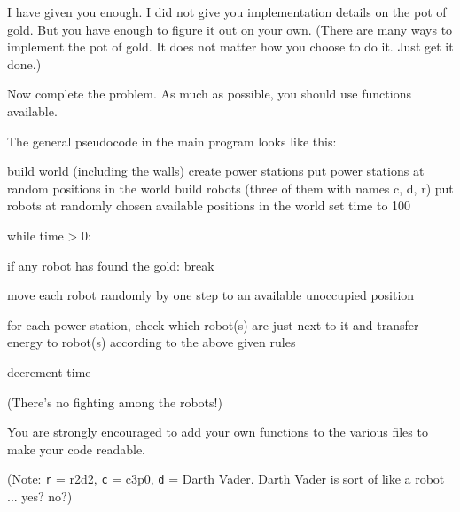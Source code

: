 I have given you enough. 
I did not give you implementation details on the pot of gold.
But you have enough to figure it out on your own.
(There are many ways to implement the pot of gold. It
does not matter how you choose to do it. Just get it done.)

Now complete the problem.
As much as possible, you should use functions available.

The general pseudocode in the main program looks like this:
\begin{console}
build world (including the walls)
create power stations
put power stations at random positions in the world
build robots (three of them with names c, d, r)
put robots at randomly chosen available positions in the world
set time to 100

while time > 0:

    if any robot has found the gold:
        break

    move each robot randomly by one step to an available unoccupied
    position

    for each power station, check which robot(s) are just next to it
    and transfer energy to robot(s) according to the above given rules

    decrement time
\end{console}

(There's no fighting among the robots!)

You are strongly encouraged to add your own functions to the
various files to make your code readable.

(Note: \verb!r! = r2d2, \verb!c! = c3p0, \verb!d! = Darth Vader. 
Darth Vader is sort of like a robot ... yes? no?)
